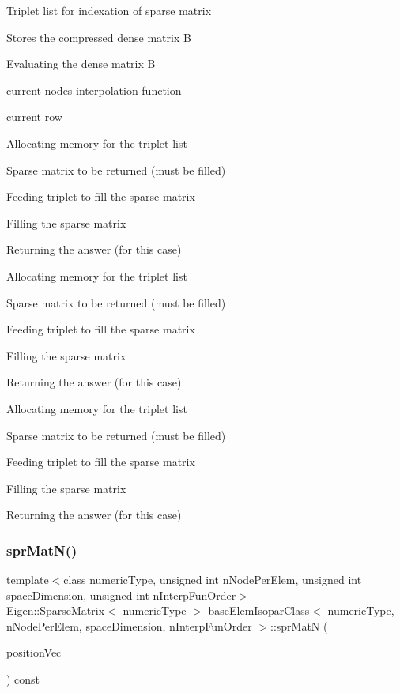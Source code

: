Triplet list for indexation of sparse matrix

Stores the compressed dense matrix B

Evaluating the dense matrix B

current node\textquotesingle{}s interpolation function

current row

Allocating memory for the triplet list

Sparse matrix to be returned (must be filled)

Feeding triplet to fill the sparse matrix

Filling the sparse matrix

Returning the answer (for this case)

Allocating memory for the triplet list

Sparse matrix to be returned (must be filled)

Feeding triplet to fill the sparse matrix

Filling the sparse matrix

Returning the answer (for this case)

Allocating memory for the triplet list

Sparse matrix to be returned (must be filled)

Feeding triplet to fill the sparse matrix

Filling the sparse matrix

Returning the answer (for this case) \mbox{\label{classbase_elem_isopar_class_ae8e9eb53ac374d61e86e0f24300c586c}} 
\subsubsection{\texorpdfstring{spr\+Mat\+N()}{sprMatN()}}
{\footnotesize\ttfamily template$<$class numeric\+Type, unsigned int n\+Node\+Per\+Elem, unsigned int space\+Dimension, unsigned int n\+Interp\+Fun\+Order$>$ \\
Eigen\+::\+Sparse\+Matrix$<$ numeric\+Type $>$ \mbox{\hyperlink{classbase_elem_isopar_class}{base\+Elem\+Isopar\+Class}}$<$ numeric\+Type, n\+Node\+Per\+Elem, space\+Dimension, n\+Interp\+Fun\+Order $>$\+::spr\+MatN (\begin{DoxyParamCaption}\item[{const Matrix$<$ numeric\+Type, space\+Dimension, 1 $>$ \&}]{position\+Vec }\end{DoxyParamCaption}) const}

